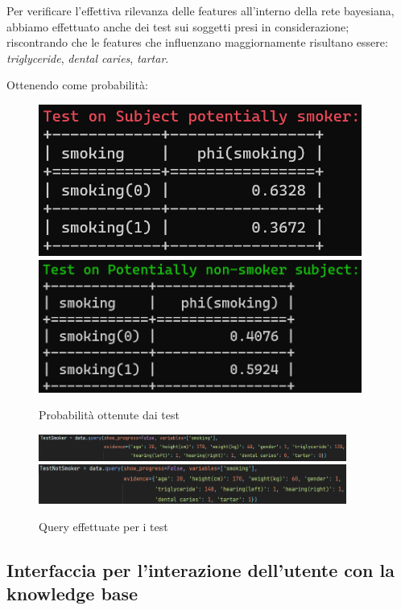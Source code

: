 \documentclass{article}
\begin{document}
\noindent
Per verificare l'effettiva rilevanza delle features all'interno della rete bayesiana, abbiamo effettuato anche dei test sui soggetti presi in considerazione; riscontrando  che le features che influenzano maggiornamente risultano essere: \textit{triglyceride}, \textit{dental caries}, \textit{tartar}.   
%

\noindent
Ottenendo come probabilità:

\begin{figure}[H]
        \includegraphics[width=10.6cm]{testSmoke}
        \includegraphics[width=10.6cm]{testNotSmoke}
        \centering
        \caption{Probabilità ottenute dai test}
        \centering
\end{figure}

\begin{figure}[H]
        \includegraphics[width=0.9\textwidth]{queryTestSmok}
        \includegraphics[width=0.9\textwidth]{queryTestNotSMok}
        \centering
        \caption{Query effettuate per i test}
        \centering
\end{figure}
%

\subsection{Interfaccia per l'interazione dell'utente con la knowledge base}
\end{document}
